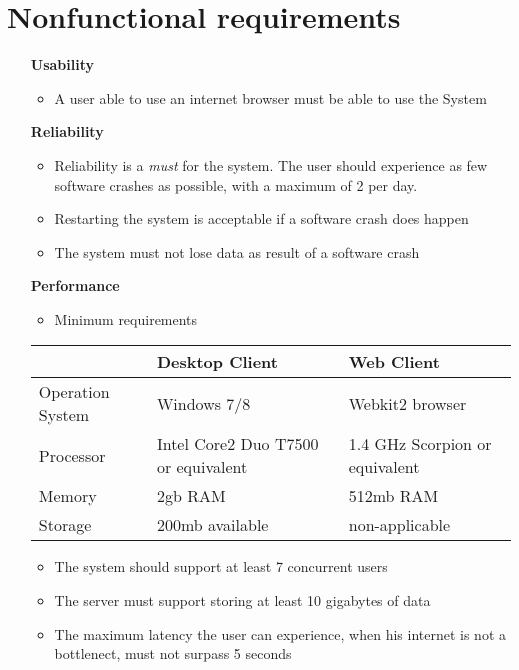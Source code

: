 \section{Nonfunctional requirements}

\begin{itemize}

\item[\textbf{Usability}]
\begin{itemize}
\item A user able to use an internet browser must be able to use the System
\end{itemize}

\vspace{0.2cm}
\item[\textbf{Reliability}]
\begin{itemize}
\item Reliability is a \textit{must} for the system. The user should experience as few software crashes as possible, with a maximum of 2 per day.
\item Restarting the system is acceptable if a software crash does happen
\item The system must not lose data as result of a software crash
\end{itemize}


\vspace{0.2cm}
\item[\textbf{Performance}] 

\hspace{50cm}

\begin{itemize}
\item Minimum requirements
\end{itemize}


\begin{tabular}{|p{2cm}|p{5cm}|p{5cm}|}
\hline  & Desktop Client & Web Client \\ 
\hline Operation System & Windows 7/8 & Webkit2 browser \\
\hline Processor & Intel Core2 Duo T7500 or equivalent & 1.4 GHz Scorpion or equivalent \\ 
\hline Memory & 2gb RAM & 512mb RAM \\ 
\hline Storage & 200mb available & non-applicable \\ 
\hline 
\end{tabular} 

\vspace{0.2cm}

\begin{itemize}
\item The system should support at least 7 concurrent users
\item The server must support storing at least 10 gigabytes of data
\item The maximum latency the user can experience, when his internet is not a bottlenect, must not surpass 5 seconds
\end{itemize}


\end{itemize}
